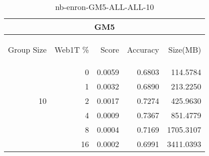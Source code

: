 \begin{center}
\begin{table}[htbp]
\begin{tabular}{ | r | r | r | r | r |}
\hline
\multicolumn{5}{|c|}{GM5}\\
\hline
\begin{sideways}Group Size\end{sideways} & \begin{sideways}Web1T \%\end{sideways} & \begin{sideways}Score\end{sideways} & \begin{sideways}Accuracy\end{sideways} & \begin{sideways}Size(MB)\end{sideways}\\
\hline
\multirow{5}{*}{10}
 & 0 & 0.0059 & 0.6803 & 114.5784\\ \cline{2-5}
 & 1 & 0.0032 & 0.6890 & 213.2250\\ \cline{2-5}
 & 2 & 0.0017 & 0.7274 & 425.9630\\ \cline{2-5}
 & 4 & 0.0009 & 0.7367 & 851.4779\\ \cline{2-5}
 & 8 & 0.0004 & 0.7169 & 1705.3107\\ \cline{2-5}
 & 16 & 0.0002 & 0.6991 & 3411.0393\\ \cline{2-5}
\hline
\end{tabular}
\caption{nb-enron-GM5-ALL-ALL-10}
\label{table:nb-enron-GM5-ALL-ALL-10}
\end{table}
\end{center}

